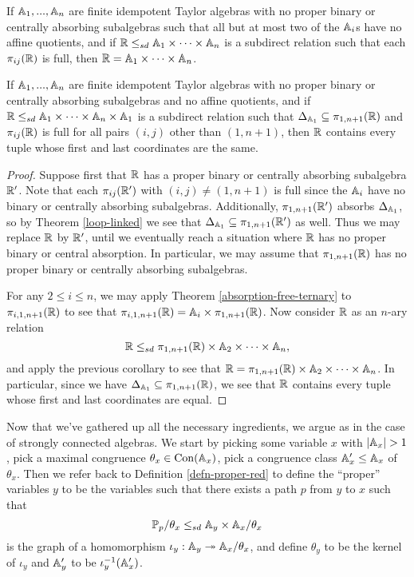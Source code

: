 \documentclass[letterpaper,11pt]{article}
\DeclareMathOperator{\Con}{Con}
\begin{document}
\begin{cor}\label{cor-abs-free-arc} If $\mathbb{A}_1, ..., \mathbb{A}_n$ are finite idempotent Taylor algebras with no proper binary or centrally absorbing subalgebras such that all but at most two of the $\mathbb{A}_i$s have no affine quotients, and if $\mathbb{R} \le_{sd} \mathbb{A}_1 \times \cdots \times \mathbb{A}_n$ is a subdirect relation such that each $\pi_{ij}(\mathbb{R})$ is full, then $\mathbb{R} = \mathbb{A}_1 \times \cdots \times \mathbb{A}_n$.
\end{cor}

\begin{cor}\label{cor-abs-free-pq} If $\mathbb{A}_1, ..., \mathbb{A}_n$ are finite idempotent Taylor algebras with no proper binary or centrally absorbing subalgebras and no affine quotients, and if $\mathbb{R} \le_{sd} \mathbb{A}_1 \times \cdots \times \mathbb{A}_n \times \mathbb{A}_1$ is a subdirect relation such that $\Delta_{\mathbb{A}_1} \subseteq \pi_{1,n+1}(\mathbb{R})$ and $\pi_{ij}(\mathbb{R})$ is full for all pairs $(i,j)$ other than $(1,n+1)$, then $\mathbb{R}$ contains every tuple whose first and last coordinates are the same.
\end{cor}
\begin{proof} Suppose first that $\mathbb{R}$ has a proper binary or centrally absorbing subalgebra $\mathbb{R}'$. Note that each $\pi_{ij}(\mathbb{R}')$ with $(i,j) \ne (1,n+1)$ is full since the $\mathbb{A}_i$ have no binary or centrally absorbing subalgebras. Additionally, $\pi_{1,n+1}(\mathbb{R}')$ absorbs $\Delta_{\mathbb{A}_1}$, so by Theorem \ref{loop-linked} we see that $\Delta_{\mathbb{A}_1} \subseteq \pi_{1,n+1}(\mathbb{R}')$ as well. Thus we may replace $\mathbb{R}$ by $\mathbb{R}'$, until we eventually reach a situation where $\mathbb{R}$ has no proper binary or central absorption. In particular, we may assume that $\pi_{1,n+1}(\mathbb{R})$ has no proper binary or centrally absorbing subalgebras.

For any $2 \le i \le n$, we may apply Theorem \ref{absorption-free-ternary} to $\pi_{i,1,n+1}(\mathbb{R})$ to see that $\pi_{i,1,n+1}(\mathbb{R}) = \mathbb{A}_i \times \pi_{1,n+1}(\mathbb{R})$. Now consider $\mathbb{R}$ as an $n$-ary relation
\[
\mathbb{R} \le_{sd} \pi_{1,n+1}(\mathbb{R}) \times \mathbb{A}_2 \times \cdots \times \mathbb{A}_n,
\]
and apply the previous corollary to see that $\mathbb{R} = \pi_{1,n+1}(\mathbb{R}) \times \mathbb{A}_2 \times \cdots \times \mathbb{A}_n$. In particular, since we have $\Delta_{\mathbb{A}_1} \subseteq \pi_{1,n+1}(\mathbb{R})$, we see that $\mathbb{R}$ contains every tuple whose first and last coordinates are equal.
\end{proof}

Now that we've gathered up all the necessary ingredients, we argue as in the case of strongly connected algebras. We start by picking some variable $x$ with $|\mathbb{A}_x| > 1$, pick a maximal congruence $\theta_x \in \Con(\bA_x)$, pick a congruence class $\mathbb{A}_x' \le \mathbb{A}_x$ of $\theta_x$. Then we refer back to Definition \ref{defn-proper-red} to define the ``proper'' variables $y$ to be the variables such that there exists a path $p$ from $y$ to $x$ such that
\[
\mathbb{P}_p/\theta_x \le_{sd} \mathbb{A}_y \times \mathbb{A}_x/\theta_x
\]
is the graph of a homomorphism $\iota_y : \mathbb{A}_y \twoheadrightarrow \mathbb{A}_x/\theta_x$, and define $\theta_y$ to be the kernel of $\iota_y$ and $\mathbb{A}_y'$ to be $\iota_y^{-1}(\mathbb{A}_x')$.
\end{document}
